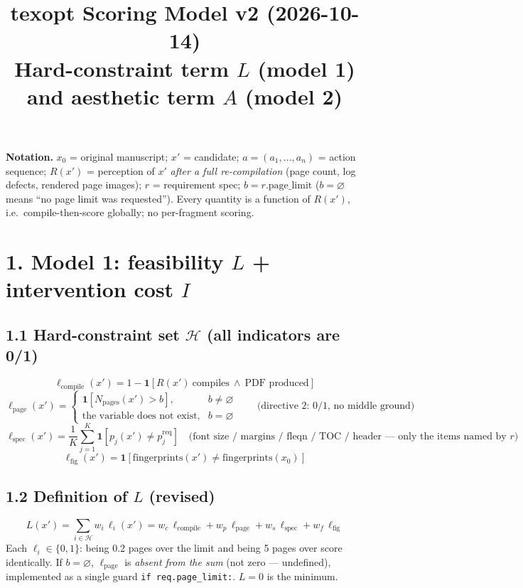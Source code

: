 \documentclass[10pt,a4paper]{article}
\title{\vspace{-2.2em}\textbf{texopt Scoring Model v2 (2026-10-14)}\\[2pt]
\large Hard-constraint term $L$ (model 1) and aesthetic term $A$ (model 2)}
\date{}
\newcommand{\ind}{\mathbf{1}}
\begin{document}
\maketitle
\vspace{-2.2em}

\noindent\textbf{Notation.} $x_0$ = original manuscript; $x'$ = candidate;
$a=(a_1,\dots,a_n)$ = action sequence; $R(x')$ = perception of $x'$ \emph{after a full
re-compilation} (page count, log defects, rendered page images); $r$ = requirement spec;
$b = r.\text{page\_limit}$ ($b=\varnothing$ means ``no page limit was requested'').
Every quantity is a function of $R(x')$, i.e.\ compile-then-score globally; no per-fragment scoring.

\section*{1. Model 1: feasibility $L$ + intervention cost $I$}

\subsection*{1.1 Hard-constraint set $\mathcal{H}$ (all indicators are 0/1)}
\[
\ell_{\text{compile}}(x') = 1-\ind\!\left[R(x')\ \text{compiles}\ \wedge\ \text{PDF produced}\right]
\]
\[
\ell_{\text{page}}(x')=
\begin{cases}
\ind\!\left[N_{\text{pages}}(x') > b\right], & b \neq \varnothing\\[2pt]
\text{the variable does not exist}, & b = \varnothing
\end{cases}
\qquad\text{(directive 2: 0/1, no middle ground)}
\]
\[
\ell_{\text{spec}}(x')=\frac{1}{K}\sum_{j=1}^{K}\ind\!\left[p_j(x')\neq p_j^{\text{req}}\right]
\quad\text{(font size / margins / fleqn / TOC / header --- only the items named by $r$)}
\]
\[
\ell_{\text{fig}}(x')=\ind\!\left[\text{fingerprints}(x')\neq \text{fingerprints}(x_0)\right]
\]

\subsection*{1.2 Definition of $L$ (revised)}
\[
\boxed{\;L(x')=\sum_{i\in\mathcal{H}} w_i\,\ell_i(x')
= w_c\,\ell_{\text{compile}}+w_p\,\ell_{\text{page}}+w_s\,\ell_{\text{spec}}+w_f\,\ell_{\text{fig}}\;}
\]
Each $\ell_i\in\{0,1\}$: being 0.2 pages over the limit and being 5 pages over score identically.
If $b=\varnothing$, $\ell_{\text{page}}$ is \emph{absent from the sum} (not zero --- undefined),
implemented as a single guard \texttt{if req.page\_limit:}. $L=0$ is the minimum.
\end{document}
